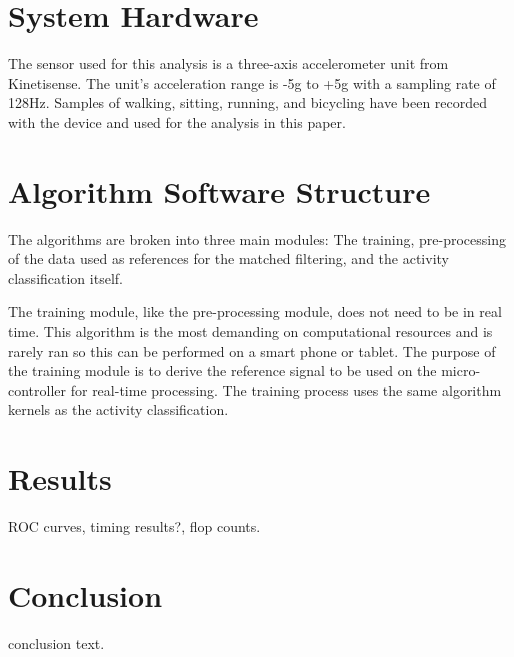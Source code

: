 \documentclass[journal]{IEEEtran}
\begin{document}
\section{System Hardware}
The sensor used for this analysis is a three-axis accelerometer unit from Kinetisense.  The unit’s acceleration range is -5g to +5g with a sampling rate of 128Hz.  Samples of walking, sitting, running, and bicycling have been recorded with the device and used for the analysis in this paper.
%
\section{Algorithm Software Structure}
%
The algorithms are broken into three main modules: The training, pre-processing of the data used as references for the matched filtering, and the activity classification itself.

The training module, like the pre-processing module, does not need to be in real time. This algorithm is the most demanding on computational resources and is rarely ran so this can be performed on a smart phone or tablet. The purpose of the training module is to derive the reference signal to be used on the micro-controller for real-time processing. The training process uses the same algorithm kernels as the activity classification.
%
\section{Results}
%
ROC curves, timing results?, flop counts.
%
\section{Conclusion}
conclusion text.
%
\appendices
%
\ifCLASSOPTIONcaptionsoff
  \newpage
\fi
%


\end{document}
